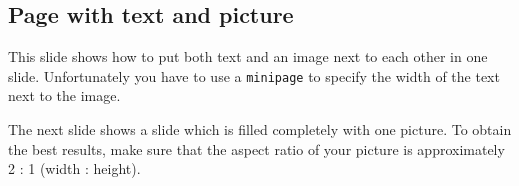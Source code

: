 \documentclass[a4paper]{article}            %
\begin{document}
\begin{slidetop}


\begin{minipage}{12cm}   %
\section*{Page with text and picture}

This slide shows how to put both text and an image next to each other in one slide. Unfortunately you have to use a \verb|minipage| to specify the width of the text next to the image.

The next slide shows a slide which is filled completely with one picture. To obtain the best results, make sure that the aspect ratio of your picture is approximately 2 : 1 (width : height).
\end{minipage}
\end{slidetop}

\begin{slidetop}

\end{slidetop}
\end{document}
